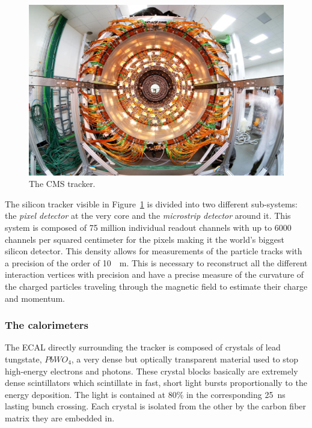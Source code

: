 	\begin{figure}
		\centering
		\includegraphics[width = \linewidth]{fig/chapt2/Tracker.jpg}
		\caption{\label{fig:tracker} The CMS tracker.}
	\end{figure}
	
	The silicon tracker visible in Figure~\ref{fig:tracker} is divided into two different sub-systems: the \textit{pixel detector} at the very core and the \textit{microstrip detector} around it. This system is composed of 75 million individual readout channels with up to 6000 channels per squared centimeter for the pixels making it the world's biggest silicon detector. This density allows for measurements of the particle tracks with a precision of the order of \SI{10}{\mu m}. This is necessary to reconstruct all the different interaction vertices with precision and have a precise measure of the curvature of the charged particles traveling through the magnetic field to estimate their charge and momentum.
	
\endgroup
	
		\subsubsection{The calorimeters}
		\label{chapt2:sssec:calo}
	
	The ECAL directly surrounding the tracker is composed of crystals of lead tungstate, $PbWO_4$, a very dense but optically transparent material used to stop high-energy electrons and photons. These crystal blocks basically are extremely dense scintillators which scintillate in fast, short light bursts proportionally to the energy deposition. The light is contained at 80\% in the corresponding \SI{25}{ns} lasting bunch crossing. Each crystal is isolated from the other by the carbon fiber matrix they are embedded in.
	
